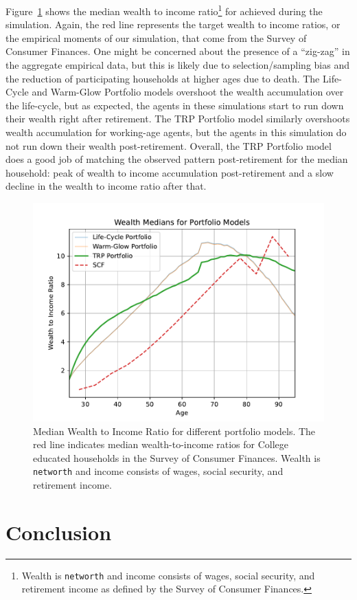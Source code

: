 \documentclass{article}
\begin{document}
Figure~\ref{medwealth} shows the median wealth to income ratio\footnote{Wealth is \texttt{networth} and income consists of wages, social security, and retirement income as defined by the Survey of Consumer Finances.} for achieved during the simulation. Again, the red line represents the target wealth to income ratios, or the empirical moments of our simulation, that come from the Survey of Consumer Finances. One might be concerned about the presence of a ``zig-zag'' in the aggregate empirical data, but this is likely due to selection/sampling bias and the reduction of participating households at higher ages due to death. The Life-Cycle and Warm-Glow Portfolio models overshoot the wealth accumulation over the life-cycle, but as expected, the agents in these simulations start to run down their wealth right after retirement. The TRP Portfolio model similarly overshoots wealth accumulation for working-age agents, but the agents in this simulation do not run down their wealth post-retirement. Overall, the TRP Portfolio model does a good job of matching the observed pattern post-retirement for the median household: peak of wealth to income accumulation post-retirement and a slow decline in the wealth to income ratio after that.

\begin{figure}[!htbp]
\centering
\includegraphics[width=0.7\linewidth]{files/median_wealth-c5d96ad61b4952e18cc47de5e0c01e1c.pdf}
\caption[]{Median Wealth to Income Ratio for different portfolio models. The red line indicates median wealth-to-income ratios for College educated households in the Survey of Consumer Finances. Wealth is \texttt{networth} and income consists of wages, social security, and retirement income.}
\label{medwealth}
\end{figure}

\section{Conclusion}
\end{document}
